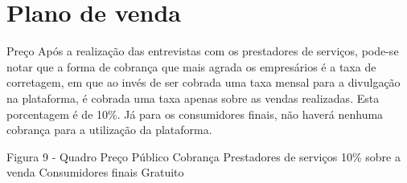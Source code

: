 \section{\textbf{Plano de venda}}
\label{sec: Plano de venda}


\begin{commentA}

\par \end{commentA}

Preço 
Após a realização das entrevistas com os prestadores de serviços, pode-se notar que a forma de cobrança que mais agrada os empresários é a taxa de corretagem, em que ao invés de ser cobrada uma taxa mensal para a divulgação na plataforma, é cobrada uma taxa apenas sobre as vendas realizadas. Esta porcentagem é de 10\%. 
Já para os consumidores finais, não haverá nenhuma cobrança para a utilização da plataforma. 

Figura 9 - Quadro Preço 
Público 	Cobrança 
Prestadores de serviços 	10\% sobre a venda 
Consumidores finais 	Gratuito 
